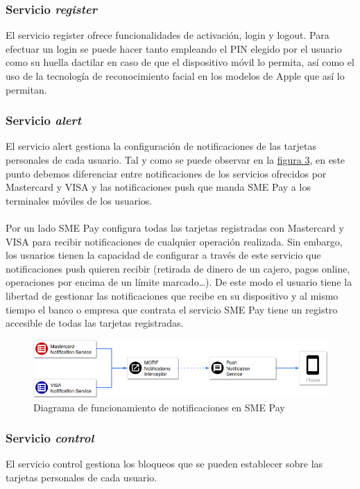 \documentclass[a4paper, 12pt]{article}
\begin{document}
\subsubsection{Servicio \emph{register}}
\label{sec-3-1-1}
El servicio register ofrece funcionalidades de activación, login y logout. Para efectuar un login se puede hacer tanto empleando el PIN elegido por el usuario como su huella dactilar en caso de que el
dispositivo móvil lo permita, así como el uso de la tecnología de reconocimiento facial en los modelos de Apple que así lo permitan.
\subsubsection{Servicio \emph{alert}}
\label{sec-3-1-2}
El servicio alert gestiona la configuración de notificaciones de las tarjetas personales de cada usuario. Tal y como se puede observar en la \hyperref[fig:trx-alert]{figura 3},
en este punto debemos diferenciar entre notificaciones de los servicios ofrecidos por Mastercard y VISA y las notificaciones push que manda SME Pay a
los terminales móviles de los usuarios.
\\
\\
Por un lado SME Pay configura todas las tarjetas registradas con Mastercard y VISA para recibir notificaciones de cualquier operación realizada. Sin embargo,
los usuarios tienen la capacidad de configurar a través de este servicio que notificaciones push quieren recibir (retirada de dinero de un cajero, pagos online,
operaciones por encima de un límite marcado\ldots{}). De este modo el usuario tiene la libertad de gestionar las notificaciones que recibe en su dispositivo y al mismo
tiempo el banco o empresa que contrata el servicio SME Pay tiene un registro accesible de todas las tarjetas registradas.
\begin{figure}[htb]
\centering
\includegraphics[width=.9\linewidth]{./images/Trx-notification.png}
\caption{\label{fig:trx-alert}Diagrama de funcionamiento de notificaciones en SME Pay}
\end{figure}
\subsubsection{Servicio \emph{control}}
\label{sec-3-1-3}
El servicio control gestiona los bloqueos que se pueden establecer sobre las tarjetas personales de cada usuario.
\end{document}
